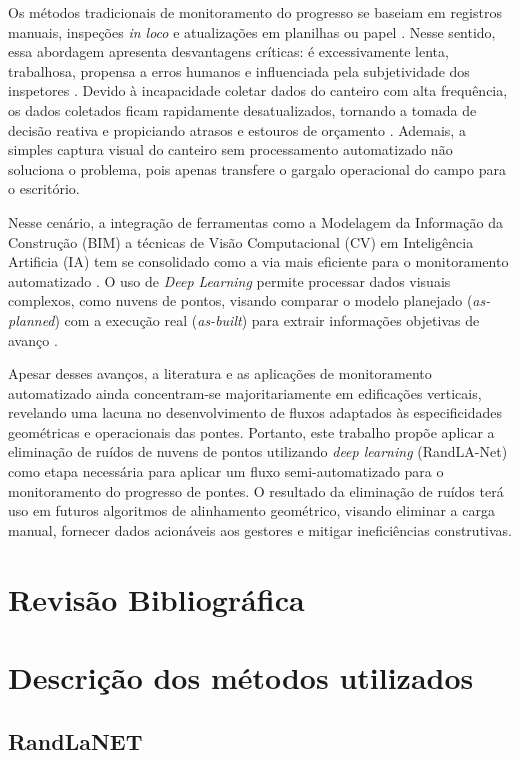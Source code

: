 \documentclass[conference]{IEEEtran}
\begin{document}
Os métodos tradicionais de monitoramento do progresso se baseiam em registros manuais, inspeções \textit{in loco} e atualizações em planilhas ou papel \cite{Pal2023}. Nesse sentido, essa abordagem apresenta desvantagens críticas: é excessivamente lenta, trabalhosa, propensa a erros humanos e influenciada pela subjetividade dos inspetores \cite{Qureshi2023}. Devido à incapacidade coletar dados do canteiro com alta frequência, os dados coletados ficam rapidamente desatualizados, tornando a tomada de decisão reativa e propiciando atrasos e estouros de orçamento \cite{Reja2022}. Ademais, a simples captura visual do canteiro sem processamento automatizado não soluciona o problema, pois apenas transfere o gargalo operacional do campo para o escritório.  



Nesse cenário, a integração de ferramentas como a Modelagem da Informação da Construção (BIM) a técnicas de Visão Computacional (CV) em Inteligência Artificia (IA) tem se consolidado como a via mais eficiente para o monitoramento automatizado \cite{Pal2023}. O uso de \textit{Deep Learning} permite processar dados visuais complexos, como nuvens de pontos, visando comparar o modelo planejado (\textit{as-planned}) com a execução real (\textit{as-built}) para extrair informações objetivas de avanço \cite{Reja2022,Braun2020 }.  

Apesar desses avanços, a literatura e as aplicações de monitoramento automatizado ainda concentram-se majoritariamente em edificações verticais, revelando uma lacuna no desenvolvimento de fluxos adaptados às especificidades geométricas e operacionais das pontes. Portanto, este trabalho propõe aplicar a eliminação de ruídos de nuvens de pontos utilizando \textit{deep learning} (RandLA-Net) como etapa necessária para aplicar um fluxo semi-automatizado para o monitoramento do progresso de pontes. O resultado da eliminação de ruídos terá uso em futuros algoritmos de alinhamento geométrico, visando eliminar a carga manual, fornecer dados acionáveis aos gestores e mitigar ineficiências construtivas.


\section{Revisão Bibliográfica}

\section{Descrição dos métodos utilizados}
\subsection{RandLaNET}
\end{document}
